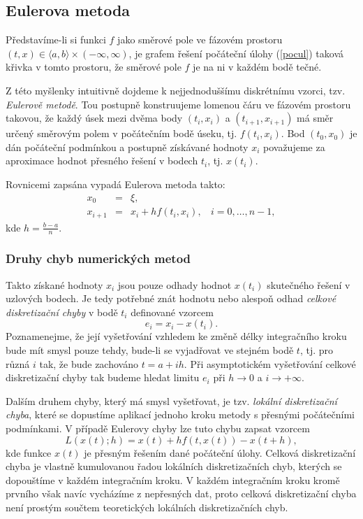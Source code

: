 \documentclass[a4paper, 12pt]{book}
\theoremstyle{definition}
\def\to{\rightarrow}
\begin{document}
\subsection{Eulerova metoda}
Představíme-li si funkci $f$ jako směrové pole ve fázovém prostoru
$(t,x)\in\langle a,b\rangle\times (-\infty,\infty)$, je grafem řešení
počáteční úlohy (\ref{pocul}) taková křivka v tomto prostoru, že směrové
pole $f$ je na ni v každém bodě tečné.

Z této myšlenky intuitivně dojdeme k nejjednoduššímu diskrétnímu vzorci,
tzv. {\em Eulerově metodě}. Tou postupně konstruujeme lomenou čáru ve fázovém
prostoru takovou, že každý úsek mezi dvěma body $(t_i,x_i)$ a $(t_{i+1},x_{i+1})$ 
má směr určený směrovým polem v počátečním bodě úseku, tj. $f(t_i,x_i)$.
Bod $(t_0,x_0)$ je dán počáteční podmínkou a postupně získávané hodnoty $x_i$
považujeme za aproximace hodnot přesného řešení v bodech $t_i$, tj. $x(t_i)$.

Rovnicemi zapsána vypadá Eulerova metoda takto:
\begin{equation}\label{Euler}
\begin{array}{crl}
x_0 & =& \xi,\\
x_{i+1} &=&x_i+h f(t_i,x_i),~~~~ i=0,\dots,n-1,
\end{array}
\end{equation}
kde $h=\frac{b-a}{n}$.

\subsubsection{Druhy chyb numerických metod}
Takto získané hodnoty $x_i$ jsou pouze odhady hodnot $x(t_i)$ skutečného řešení 
v uzlových bodech. Je tedy potřebné znát hodnotu nebo alespoň odhad {\em celkové
diskretizační chyby} v bodě $t_i$ definované vzorcem
\begin{displaymath}
e_i=x_i - x(t_i).
\end{displaymath}
Poznamenejme, že její vyšetřování vzhledem ke změně délky integračního kroku bude
mít smysl pouze tehdy, bude-li se vyjadřovat ve stejném bodě $t$, tj. pro různá
$i$ tak, že bude zachováno $t=a+ih$. Při asymptotickém vyšetřování celkové diskretizační 
chyby tak budeme hledat limitu $e_i$ při $h\to 0$ a $i\to +\infty$.

Dalším druhem chyby, který má smysl vyšetřovat, je tzv. {\em lokální diskretizační
chyba}, které se dopustíme aplikací jednoho kroku metody s přesnými počátečními
podmínkami. V případě Eulerovy chyby lze tuto chybu zapsat vzorcem
\begin{displaymath}
L(x(t);h) = x(t)+hf(t,x(t))-x(t+h),
\end{displaymath}
kde funkce $x(t)$ je přesným řešením dané počáteční úlohy. Celková diskretizační 
chyba je vlastně kumulovanou řadou lokálních diskretizačních chyb, kterých se
dopouštíme v každém integračním kroku. V každém integračním kroku kromě prvního 
však navíc vycházíme z nepřesných dat, proto celková diskretizační chyba není prostým
součtem teoretických lokálních diskretizačních chyb.
\end{document}
